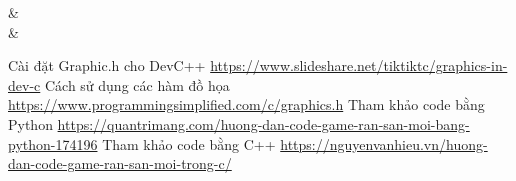 \documentclass[13pt,a4paper]{article}
\begin{document}
\begin{itemize}
\begin{tabular}
&\\
&\\

\hline
\end{tabular}
\end{itemize}
\newpage
\begin{thebibliography}{}
Cài đặt Graphic.h cho DevC++ \url{https://www.slideshare.net/tiktiktc/graphics-in-dev-c} 
Cách sử dụng các hàm đồ họa  \url{https://www.programmingsimplified.com/c/graphics.h} 
Tham khảo code bằng Python \url{https://quantrimang.com/huong-dan-code-game-ran-san-moi-bang-python-174196} 
Tham khảo code bằng C++ \url{https://nguyenvanhieu.vn/huong-dan-code-game-ran-san-moi-trong-c/} 



\end{thebibliography}
\end{document}
